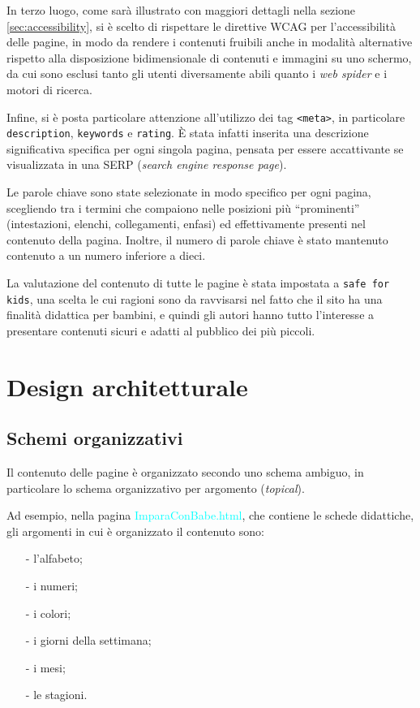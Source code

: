 \documentclass[10pt,a4paper,onecolumn]{article}
\newcommand{\sitepage}[1]{\textcolor{cyan}{\textsf{#1}}}
\newcommand{\inglese}[1]{\foreignlanguage{english}{\itshape{}#1}}
\begin{document}
In terzo luogo, come sarà illustrato con maggiori dettagli nella sezione \ref{sec:accessibility}, si è scelto di rispettare le direttive WCAG per l'accessibilità delle pagine, in modo da rendere i contenuti fruibili anche in modalità alternative rispetto alla disposizione bidimensionale di contenuti e immagini su uno schermo, da cui sono esclusi tanto gli utenti diversamente abili quanto i \inglese{web spider} e i motori di ricerca.

Infine, si è posta particolare attenzione all'utilizzo dei tag \texttt{<meta>}, in particolare \texttt{description}, \texttt{keywords} e \texttt{rating}. È stata infatti inserita una descrizione significativa specifica per ogni singola pagina, pensata per essere accattivante se visualizzata in una SERP (\inglese{search engine response page}).

Le parole chiave sono state selezionate in modo specifico per ogni pagina, scegliendo tra i termini che compaiono nelle posizioni più ``prominenti'' (intestazioni, elenchi, collegamenti, enfasi) ed effettivamente presenti nel contenuto della pagina. Inoltre, il numero di parole chiave è stato mantenuto contenuto a un numero inferiore a dieci.

La valutazione del contenuto di tutte le pagine è stata impostata a \texttt{safe for kids}, una scelta le cui ragioni sono da ravvisarsi nel fatto che il sito ha una finalità didattica per bambini, e quindi gli autori hanno tutto l'interesse a presentare contenuti sicuri e adatti al pubblico dei più piccoli.

\section{Design architetturale}
\subsection{Schemi organizzativi}
Il contenuto delle pagine è organizzato secondo uno schema ambiguo, in particolare lo schema organizzativo per argomento (\inglese{topical}).

Ad esempio, nella pagina \sitepage{ImparaConBabe.html}, che contiene le schede didattiche, gli argomenti in cui è organizzato il contenuto sono:
\begin{itemize}[noitemsep,nolistsep]
  \item[-] l'alfabeto;
  \item[-] i numeri;
  \item[-] i colori;
  \item[-] i giorni della settimana;
  \item[-] i mesi;
  \item[-] le stagioni.
\end{itemize}
\end{document}
